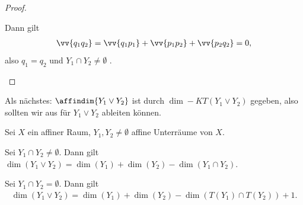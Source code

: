 \begin{proof}
\begin{proofdescription}
\begin{figure}[H]
             \label{fig:verbindungsraum_translationen_schnitt_leer_verbindungslinie_nicht_in_translationen}
         \end{figure}
         Dann gilt
         \begin{align*}
             \vv{q_1 q_2}=\vv{q_1 p_1}+\vv{p_1 p_2}+\vv{p_2 q_2}=0,
         \end{align*}
         also \( q_1=q_2 \) und \( Y_1\cap Y_2\neq \emptyset \) \contra.
    \end{proofdescription}
\end{proof}
Als nächstes: \( \affindim{Y_1\vee Y_2} \) ist durch \( \dim-{K}{T(Y_1\vee Y_2)} \) gegeben, also sollten wir aus  für \( Y_1\vee Y_2 \) ableiten können.
\begin{lemma}\label{verbindungsraum:dimension}
    Sei \( X \) ein affiner Raum, \( Y_1, Y_2\neq \emptyset \) affine Unterräume von \( X \).
    \begin{eigenschaftenenumerate}
        \item\label{verbindungsraum:dimension:schnitt_nicht_leer} Sei \( Y_1\cap Y_2\neq \emptyset \).
         Dann gilt \( \dim(Y_1\vee Y_2)=\dim(Y_1)+\dim(Y_2)-\dim(Y_1\cap Y_2) \).
        \item\label{verbindungsraum:dimension:schnitt_leer} Sei \( Y_1\cap Y_2=\emptyset \).
        Dann gilt
        \begin{align*}
            \dim(Y_1\vee Y_2)=\dim(Y_1)+\dim(Y_2)-\dim(T(Y_1)\cap T(Y_2))+1.
        \end{align*}
    \end{eigenschaftenenumerate}
    
\end{lemma}
